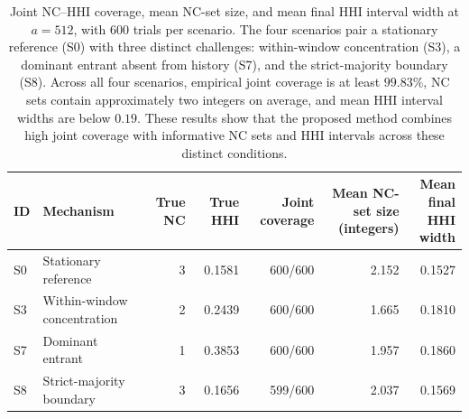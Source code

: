 \begin{table}[!t]
\centering
\small
\caption{Joint NC--HHI coverage, mean NC-set size, and mean final HHI interval width at $a=512$, with 600 trials per scenario. The four scenarios pair a stationary reference (S0) with three distinct challenges: within-window concentration (S3), a dominant entrant absent from history (S7), and the strict-majority boundary (S8). Across all four scenarios, empirical joint coverage is at least $99.83\%$, NC sets contain approximately two integers on average, and mean HHI interval widths are below $0.19$. These results show that the proposed method combines high joint coverage with informative NC sets and HHI intervals across these distinct conditions.}
\label{tab:compact-synthetic}
\setlength{\tabcolsep}{5pt}
\begin{tabular}{llrrrrr}
\toprule
ID & Mechanism & True NC & True HHI & Joint coverage & \shortstack{Mean NC-set size\\(integers)} & \shortstack{Mean final\\HHI width} \\
\midrule
S0 & Stationary reference & 3 & 0.1581 & 600/600 & 2.152 & 0.1527 \\
S3 & Within-window concentration & 2 & 0.2439 & 600/600 & 1.665 & 0.1810 \\
S7 & Dominant entrant & 1 & 0.3853 & 600/600 & 1.957 & 0.1860 \\
S8 & Strict-majority boundary & 3 & 0.1656 & 599/600 & 2.037 & 0.1569 \\
\bottomrule
\end{tabular}
\end{table}
